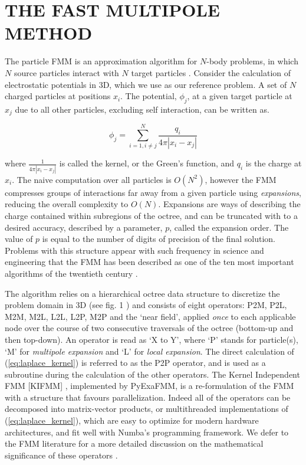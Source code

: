 \documentclass{IEEEcsmag}
\begin{document}


\section{THE FAST MULTIPOLE METHOD}

The particle FMM is an approximation algorithm for $N$-body problems, in which $N$ source particles interact with $N$ target particles \cite{Greengard1987}. Consider the calculation of electrostatic potentials in 3D, which we use as our reference problem. A set of $N$ charged particles at positions $x_i$. The potential, $\phi_j$, at a given target particle at $x_j$ due to all other particles, excluding self interaction, can be written as.

\begin{equation}
    \phi_j = \sum_{i=1, i \neq j}^{N} \frac{q_i}{4 \pi| x_i-x_j |}
    \label{eq:laplace_kernel}
\end{equation}

where $\frac{1}{4 \pi| x_i-x_j|}$ is called the kernel, or the Green's function, and $q_i$ is the charge at $x_i$. The naive computation over all particles is $O(N^2)$, however the FMM compresses groups of interactions far away from a given particle using \textit{expansions}, reducing the overall complexity to $O(N)$. Expansions are ways of describing the charge contained within subregions of the octree, and can be truncated with to a desired accuracy, described by a parameter, $p$, called the expansion order. The value of $p$ is equal to the number of digits of precision of the final solution. Problems with this structure appear with such frequency in science and engineering that the FMM has been described as one of the ten most important algorithms of the twentieth century \cite{Cipra2000}.

The algorithm relies on a hierarchical octree data structure to discretize the problem domain in 3D (see fig. 1 \cite{Sundar2007}) and consists of eight operators: P2M, P2L, M2M, M2L, L2L, L2P, M2P and the `near field', applied \textit{once} to each applicable node over the course of two consecutive traversals of the octree (bottom-up and then top-down). An operator is read as `X to Y', where `P' stands for particle(s), `M' for \textit{multipole expansion} and `L' for \textit{local expansion}. The direct calculation of (\ref{eq:laplace_kernel}) is referred to as the P2P operator, and is used as a subroutine during the calculation of the other operators. The Kernel Independent FMM [KIFMM] \cite{Ying2004}, implemented by PyExaFMM, is a re-formulation of the FMM with a structure that favours parallelization. Indeed all of the operators can be decomposed into matrix-vector products, or multithreaded implementations of (\ref{eq:laplace_kernel}), which are easy to optimize for modern hardware architectures, and fit well with Numba's programming framework. We defer to the FMM literature for a more detailed discussion on the mathematical significance of these operators \cite{Ying2004,Greengard1987}.
\end{document}
